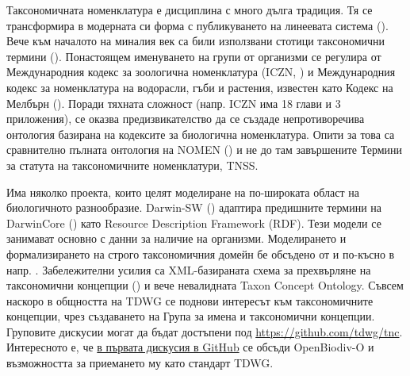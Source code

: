 Таксономичната номенклатура е дисциплина с много дълга традиция. Тя се трансформира в модерната си форма с публикуването на линеевата система (\cite {linnaeus_systema_1758}). Вече към началото на миналия век са били използвани стотици таксономични термини (\cite{witteveen_naming_2015}). Понастоящем именуването на групи от организми се регулира от Международния кодекс за зоологична номенклатура (ICZN, \cite{international_commission_on_zoological_nomenclature_official_2017}) и Международния кодекс за номенклатура на водорасли, гъби и растения, известен като Кодекс на Мелбърн (\cite{noauthor_international_2012}). Поради тяхната сложност (напр. ICZN има 18 глави и 3 приложения), се оказва предизвикателство да се създаде непротиворечива онтология базирана на кодексите за биологична номенклатура. Опити за това са сравнително пълната онтология на NOMEN (\cite{dmitriev_nomen_2017}) и не до там завършените Термини за статута на таксономичните номенклатури, TNSS.

Има няколко проекта, които целят моделиране на по-широката област на биологичното разнообразие. Darwin-SW (\cite{baskauf_darwin-sw:_2016}) адаптира предишните термини на DarwinCore (\cite{wieczorek_darwin_2012}) като Resource Description Framework (RDF). Тези модели се занимават основно с данни за наличие на организми. Моделирането и формализирането на строго таксономичния домейн бе обсъдено от \cite{berendsohn_concept_1995} и по-късно в напр. \cite{franz_perspectives:_2009, sterner_taxonomy_2017}. Забележителни усилия са XML-базираната схема за прехвърляне на таксономични концепции (\cite{taxonomic_names_and_concepts_interest_group_taxonomic_2006}) и вече невалидната Taxon Concept Ontology. Съвсем наскоро в общността на TDWG се поднови интересът към таксономичните концепции, чрез създаването на Група за имена и таксономични концепции. Груповите дискусии могат да бъдат достъпени под \url{https://github.com/tdwg/tnc}. Интересното е, че \href {https://github.com/tdwg/tnc/issues/1} {в първата дискусия в GitHub} се обсъди OpenBiodiv-O и възможността за приемането му като стандарт TDWG.


